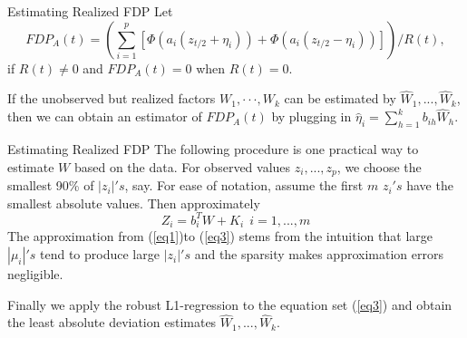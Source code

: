 \documentclass{beamer}
\begin{document}
\begin{frame}[t]{Estimating Realized FDP}\vspace{10pt}
Let 
$$ FDP_A(t) = \left(\sum_{i=1}^p\left[\Phi(a_i(z_{t/2}+\eta_i))+\Phi(a_i(z_{t/2}-\eta_i))  \right] \right)/ R(t) ,$$
if $R(t) \neq 0$ and $FDP_A(t) = 0$ when $R(t) = 0$.

If the unobserved but realized factors $W_1, · · ·, W_k$ can be estimated by  $\hat{W}_1,...,\hat{W}_k$, then we can obtain an estimator of $FDP_A(t)$ by plugging in $\hat{\eta}_i= \sum_{h=1}^k b_{ih}\hat{W}_h$.
\end{frame}

\begin{frame}[t]{Estimating Realized FDP}\vspace{10pt}
The following procedure is one practical way to estimate $W$ based on the data. For observed values $z_i,...,z_p$, we choose the smallest 90\% of $|z_i|'s$, say. For ease of
notation, assume the first $m$ $z_i's$ have the smallest absolute values. Then approximately
\begin{equation}\label{eq3}
Z_i = b_i^TW+K_i \ \   i=1,...,m
\end{equation}
The approximation from (\ref{eq1})to (\ref{eq3}) stems from the intuition that large $|\mu_i|'s$ tend to produce large $|z_i|'s$ and the sparsity makes approximation errors negligible.

Finally we apply the robust L1-regression to the equation set (\ref{eq3}) and obtain the least absolute deviation estimates $\hat{W}_1,...,\hat{W}_k$.
\end{frame}
\end{document}
